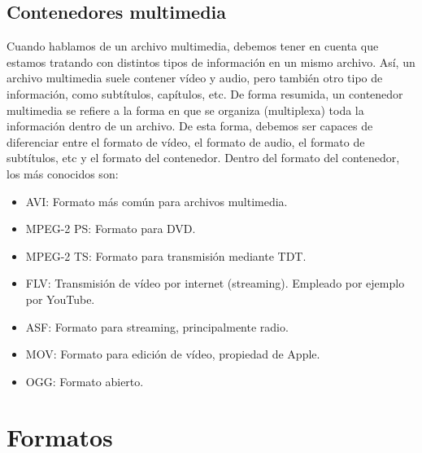 \documentclass[es,practica]{uah}
\begin{document}
\subsection{Contenedores multimedia}

Cuando hablamos de un archivo multimedia, debemos tener en cuenta que estamos tratando con distintos tipos de información en un mismo archivo. Así, un archivo multimedia suele contener vídeo y audio, pero también otro tipo de información, como subtítulos, capítulos, etc. De forma resumida, un contenedor multimedia se refiere a la forma en que se organiza (multiplexa) toda la información dentro de un archivo. De esta forma, debemos ser capaces de diferenciar entre el formato de vídeo, el formato de audio, el formato de subtítulos, etc y el formato del contenedor. Dentro del formato del contenedor, los más conocidos son:
\begin{itemize}
	\item AVI: Formato más común para archivos multimedia.
	\item MPEG-2 PS: Formato para DVD.
	\item MPEG-2 TS: Formato para transmisión mediante TDT.
	\item FLV: Transmisión de vídeo por internet (streaming). Empleado por ejemplo por YouTube.
	\item ASF: Formato para streaming, principalmente radio.
	\item MOV: Formato para edición de vídeo, propiedad de Apple.
	\item OGG: Formato abierto.
\end{itemize}


\section{Formatos}
\end{document}
